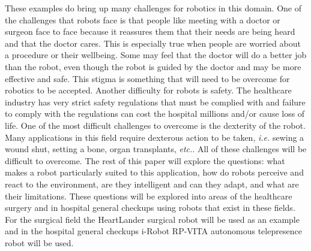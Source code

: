 \documentclass[11pt,conference]{IEEEtran}
\begin{document}
\newline
\indent These examples do bring up many challenges for robotics in this domain. One of the challenges that robots face is that people like meeting with a doctor or surgeon face to face because it reassures them that their needs are being heard and that the doctor cares.  This is especially true when people are worried about a procedure or their wellbeing.  Some may feel that the doctor will do a better job than the robot, even though the robot is guided by the doctor and may be more effective and safe.  This stigma is something that will need to be 
overcome for robotics to be accepted.  Another difficulty for robots is safety.  The healthcare industry has very strict safety regulations that must be complied with and failure to comply with the regulations can cost the hospital millions and/or cause loss of life.  One of the most difficult challenges to overcome is the dexterity of the robot.  Many applications in this field require dexterous action to be taken, \textit{i.e.} sewing a wound shut, setting a bone, organ transplants, \textit{etc.}.  All of these challenges will be difficult to overcome. 
\newline
\indent The rest of this paper will explore the questions: what makes a robot particularly suited to this application, how do robots perceive and react to the environment, are they intelligent and can they adapt, and what are their limitations.  These questions will be explored into areas of the healthcare surgery and in hospital general checkups using robots that exist in these fields.  For the surgical field the HeartLander surgical robot will be used as an example and in the hospital general checkups i-Robot RP-VITA autonomous telepresence robot will be used. 
\end{document}
